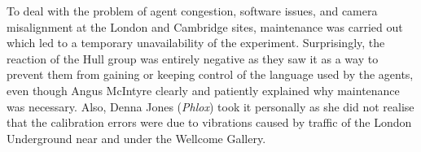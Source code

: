 \enlargethispage{1\baselineskip}

To deal with the problem of agent congestion, software issues, and camera misalignment at the London 
and Cambridge sites, maintenance was carried out which led to a temporary unavailability of the experiment. 
Surprisingly, the reaction of the Hull group was entirely negative as they saw it as a 
way to prevent them from gaining or keeping control of the language used by the agents, even though 
Angus McIntyre clearly and patiently explained why maintenance was necessary. Also, Denna Jones ({\itshape Phlox}) took 
it personally as she did not realise that the calibration errors were due to vibrations caused by
traffic of the London Underground near and under the Wellcome Gallery.


\begin{mail}


\end{mail}
